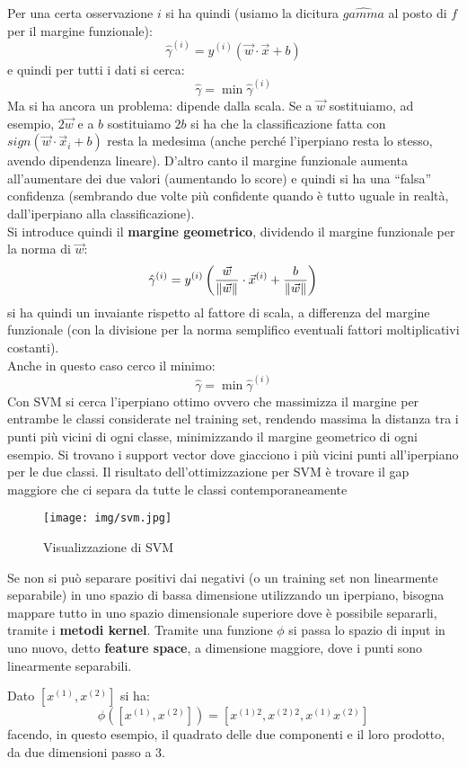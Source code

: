 Per una certa osservazione $i$ si ha quindi (usiamo la dicitura $\hat{gamma}$ al
posto di $f$ per il margine funzionale):
\[\hat{\gamma}^{(i)}=y^{(i)}(\vec{w}\cdot\vec{x}+b)\]
e quindi per tutti i dati si cerca:
\[\hat{\gamma}=\min \hat{\gamma}^{(i)}\]
Ma si ha ancora un problema: dipende dalla scala. Se a $\vec{w}$ sostituiamo,
ad esempio, $2\vec{w}$ e a $b$ sostituiamo $2b$ si ha che la classificazione
fatta con $sign(\vec{w}\cdot\vec{x}_i+b)$ resta la medesima (anche perché
l'iperpiano resta lo stesso, avendo dipendenza lineare). D'altro canto il
margine funzionale aumenta all'aumentare dei due valori (aumentando lo score) e
quindi si ha una ``falsa'' confidenza (sembrando due volte più confidente quando
è tutto uguale in realtà, dall'iperpiano alla classificazione).\\
Si introduce quindi il \textbf{margine geometrico}, dividendo il margine
funzionale per la norma di $\vec{w}$:
\[\hat{\gamma}^{(i)}=y^{(i)}\left(\frac{\vec{w}}{\norm{\vec{w}}}
    \cdot\vec{x}^{(i)}+\frac{b}{\norm{\vec{w}}}\right)\]
si ha quindi un invaiante rispetto al fattore di scala, a differenza del margine
funzionale (con la divisione per la norma semplifico eventuali fattori
moltiplicativi costanti).\\
Anche in questo caso cerco il minimo:
\[\hat{\gamma}=\min \hat{\gamma}^{(i)}\]
Con SVM si cerca l'iperpiano ottimo ovvero che massimizza il margine per
entrambe le classi considerate nel training set, rendendo massima la distanza
tra i punti più vicini di ogni classe, minimizzando il margine geometrico di
ogni esempio. Si trovano i support vector dove giacciono i più vicini punti
all'iperpiano per le due classi. Il risultato dell'ottimizzazione per SVM è
trovare il gap maggiore che ci separa da tutte le classi contemporaneamente
\begin{figure}[H]
  \centering
  \texttt{[image: img/svm.jpg]}
  \caption{Visualizzazione di SVM}
  \label{fig:svm}
\end{figure}
Se non si può separare positivi dai negativi (o un training set non linearmente
separabile) in uno spazio di bassa dimensione
utilizzando un iperpiano, bisogna mappare tutto in uno spazio dimensionale
superiore dove è possibile separarli, tramite i \textbf{metodi kernel}. Tramite
una funzione $\phi$ si passa lo spazio di input in uno nuovo, detto
\textbf{feature space}, a dimensione maggiore, dove i punti sono linearmente
separabili.  
\begin{esempio}
  Dato $[x^{(1)},x^{(2)}]$ si ha:
  \[\phi([x^{(1)},x^{(2)}])=[x^{(1)2},x^{(2)2},x^{(1)}x^{(2)}]\]
  facendo, in questo esempio, il quadrato delle due componenti e il loro
  prodotto, da due dimensioni passo a 3.
\end{esempio}
